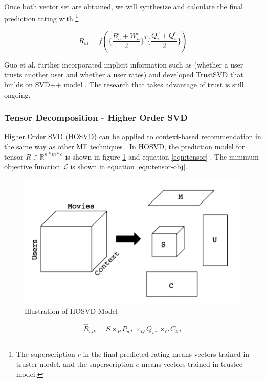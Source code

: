 \documentclass[letter paper, 11pt]{article}
\begin{document}
	Once both vector set are obtained, we will synthesize and calculate the final prediction rating with \footnote{The superscription $r$ in the final predicted rating means vectors trained in truster model, and the superscription $e$ means vectors trained in trustee model. }

	\begin{equation}
		\tag*{final prediction rating by TrustMF}
		R_{ui} = f(\{\dfrac{B_u^r + W_u^r}{2}\}^T \{\dfrac{Q_i^e + Q_i^e}{2}\})
	\end{equation}

	Guo et al. further incorporated implicit information such as (whether a user trusts another user and whether a user rates) and developed TrustSVD that builds on SVD++ model \cite{TrustSVD}. The research that takes advantage of trust is still ongoing.
	
	\subsubsection{Tensor Decomposition - Higher Order SVD}
	Higher Order SVD (HOSVD) can be applied to context-based recommendation in the same way as other MF techniques \cite{tensor}. In HOSVD, the prediction model for tensor $R \in \mathbb{R}^{n * m * c}$ is shown in figure \ref{fig:tensor} and equation \ref{eqn:tensor} \cite{latentFactor-RS}. The minimum objective function $\mathcal{L}$ is shown in equation \ref{eqn:tensor-obj}.
	
	\begin{figure}\label{fig:tensor}
		\centering
		\caption{Illustration of HOSVD Model \cite{tensor}}
		\includegraphics{tensor.png}
	\end{figure}
	
	\begin{equation}
		\label{eqn:tensor}
		\hat{R}_{uik} = S \times_P P_{u*} \times_Q Q_{i*} \times_C C_{k*}
	\end{equation}
	
\end{document}
